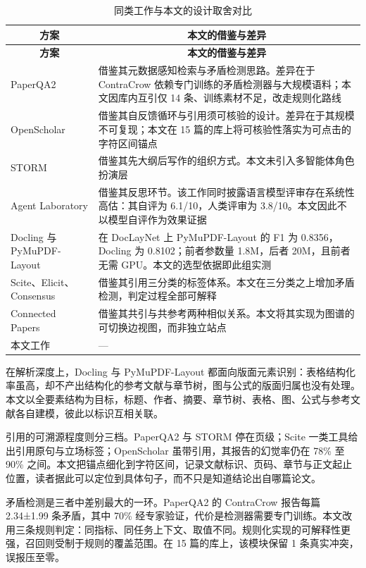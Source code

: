 \documentclass[UTF8,fontset=windows,zihao=5,a4paper]{ctexart}
\begin{document}
\begin{longtable}{@{}p{}p{}@{}}
\caption{同类工作与本文的设计取舍对比}\\
\toprule
\multicolumn{1}{c}{\textbf{方案}} & \multicolumn{1}{c}{\textbf{本文的借鉴与差异}} \\
\midrule
\endfirsthead
\toprule
\multicolumn{1}{c}{\textbf{方案}} & \multicolumn{1}{c}{\textbf{本文的借鉴与差异}} \\
\midrule
\endhead
\bottomrule
\endfoot
PaperQA2 \cite{ref20} & 借鉴其元数据感知检索与矛盾检测思路。差异在于 ContraCrow 依赖专门训练的矛盾检测器与大规模语料；本文因库内互引仅 14 条、训练素材不足，改走规则化路线 \\
OpenScholar \cite{ref21} & 借鉴其自反馈循环与引用须可核验的设计。差异在于其规模不可复现；本文在 15 篇的库上将可核验性落实为可点击的字符区间锚点 \\
STORM \cite{ref22} & 借鉴其先大纲后写作的组织方式。本文未引入多智能体角色扮演层 \\
Agent Laboratory \cite{ref23} & 借鉴其反思环节。该工作同时披露语言模型评审存在系统性高估：其自评为 6.1/10，人类评审为 3.8/10。本文因此不以模型自评作为效果证据 \\
Docling 与 PyMuPDF-Layout \cite{ref26}\cite{ref27} & 在 DocLayNet 上 PyMuPDF-Layout 的 F1 为 0.8356，Docling 为 0.8102；前者参数量 1.8M，后者 20M，且前者无需 GPU。本文的选型依据即此组实测 \\
Scite、Elicit、Consensus \cite{ref28} & 借鉴其引用三分类的标签体系。本文在三分类之上增加矛盾检测，判定过程全部可解释 \\
Connected Papers \cite{ref29} & 借鉴其共引与共参考两种相似关系。本文将其实现为图谱的可切换边视图，而非独立站点 \\
本文工作 & — \\
\end{longtable}

在解析深度上，Docling 与 PyMuPDF-Layout 都面向版面元素识别：表格结构化率虽高，却不产出结构化的参考文献与章节树，图与公式的版面归属也没有处理。本文以全要素结构为目标，标题、作者、摘要、章节树、表格、图、公式与参考文献各自建模，彼此以标识互相关联。

引用的可溯源程度则分三档。PaperQA2 与 STORM 停在页级；Scite 一类工具给出引用原句与立场标签；OpenScholar 虽带引用，其报告的幻觉率仍在 78\% 至 90\% 之间。本文把锚点细化到字符区间，记录文献标识、页码、章节与正文起止位置，读者据此可以定位到具体句子，而不只是知道结论出自哪篇论文。

矛盾检测是三者中差别最大的一环。PaperQA2 的 ContraCrow 报告每篇 2.34±1.99 条矛盾，其中 70\% 经专家验证，代价是检测器需要专门训练。本文改用三条规则判定：同指标、同任务上下文、取值不同。规则化实现的可解释性更强，召回则受制于规则的覆盖范围。在 15 篇的库上，该模块保留 1 条真实冲突，误报压至零。
\end{document}
